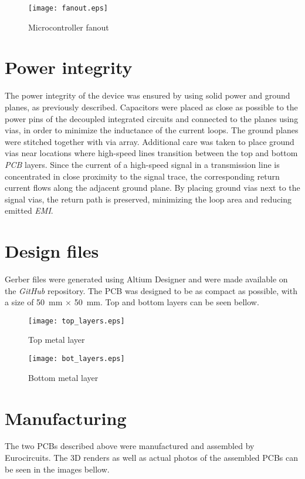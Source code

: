 \FloatBarrier
\begin{figure}[htp!]
    \centering
    \texttt{[image: fanout.eps]}
    \caption{Microcontroller fanout}
    \label{fig:fanout}
\end{figure}
\FloatBarrier

\section{Power integrity}
The power integrity of the device was ensured by using solid power and ground planes, as previously described. Capacitors were placed as close as possible to the power pins of the decoupled integrated circuits and connected to the planes using vias, in order to minimize the inductance of the current loops. The ground planes were stitched together with via array. Additional care was taken to place ground vias near locations where high-speed lines transition between the top and bottom \emph{PCB} layers. Since the current of a high-speed signal in a transmission line is concentrated in close proximity to the signal trace, the corresponding return current flows along the adjacent ground plane. By placing ground vias next to the signal vias, the return path is preserved, minimizing the loop area and reducing emitted \emph{EMI}.

\section{Design files}
Gerber files were generated using Altium Designer and were made available on the \emph{GitHub} repository. The PCB was designed to be as compact as possible, with a size of \SI{50}{\milli\meter} $\times$ \SI{50}{\milli\meter}. Top and bottom layers can be seen bellow.

\FloatBarrier
\begin{figure}[htp!]
    \centering
    \texttt{[image: top\_layers.eps]}
    \caption{Top metal layer}
    \label{fig:metal_top}
\end{figure}
\FloatBarrier

\FloatBarrier
\begin{figure}[htp!]
    \centering
    \texttt{[image: bot\_layers.eps]}
    \caption{Bottom metal layer}
    \label{fig:metal_bot}
\end{figure}
\FloatBarrier

\section{Manufacturing}
The two PCBs described above were manufactured and assembled by Eurocircuits. The 3D renders as well as actual photos of the assembled PCBs can be seen in the images bellow. 



